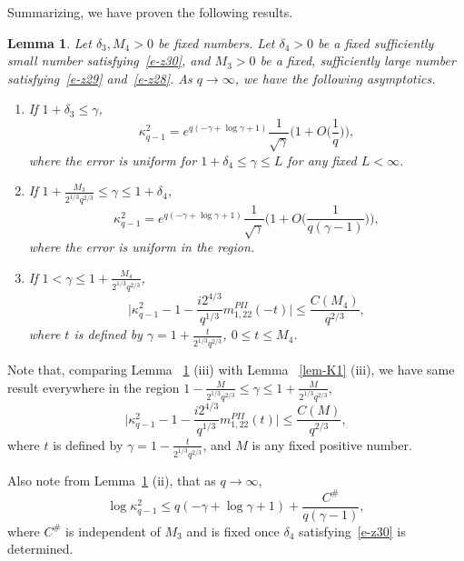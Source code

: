 \documentclass{amsart}
\newtheorem{lem}[thm]{Lemma}
\theoremstyle{definition}
\theoremstyle{remark}
\numberwithin{equation}{section}
\begin{document}
Summarizing, we have proven the following results.
\begin{lem}\label{lem-K2}
  Let $\delta_3, M_4>0$ be fixed numbers.
  Let $\delta_4>0$ be a fixed sufficiently 
small number satisfying~\eqref{e-z30}, 
and $M_3>0$ be a fixed, sufficiently large number 
satisfying~\eqref{e-z29} and~\eqref{e-z28}.
As $q \to \infty$, we have the following asymptotics.
  \begin{enumerate}
    \item If $1+\delta_3 \le \gamma$,
\begin{equation*}
  \kappa^2_{q-1}
= e^{q(-\gamma+\log \gamma+1)}\frac1{\sqrt{\gamma}}
\biggl(1+O\bigl(\frac1{q}\bigr)\biggr),
\end{equation*}
where the error is uniform for $1+\delta_4 \le \gamma\le L$ for 
any fixed $L< \infty$.
    \item If $1+\frac{M_3}{2^{1/3}q^{2/3}} \le \gamma \le 1+\delta_4$,
\begin{equation*}
  \kappa^2_{q-1}=e^{q(-\gamma+\log \gamma+1)} \frac1{\sqrt{\gamma}}
\biggl(1+O\bigl(\frac1{q(\gamma-1)}\bigr) \biggr),
\end{equation*}
where the error is uniform in the region.
    \item If $1< \gamma \le 1+\frac{M_4}{2^{1/3}q^{2/3}}$, 
\begin{equation*}
  \bigl|\kappa^2_{q-1}
- 1 -\frac{i2^{4/3}}{q^{1/3}}m^{PII}_{1,22}(-t)\bigr|\le  \frac{C(M_4)}{q^{2/3}},
\end{equation*}
where $t$ is defined by $\gamma=1+\frac{t}{2^{1/3}q^{2/3}}$, $0\le t\le M_4$.
  \end{enumerate}
\end{lem}

Note that, comparing Lemma ~\ref{lem-K2} (iii) with Lemma ~\ref{lem-K1} (iii), 
we have same result everywhere in the region $1-\frac{M}{2^{1/3}q^{2/3}} \le 
\gamma \le 1+\frac{M}{2^{1/3}q^{2/3}}$, 
\begin{equation}\label{e-z36}
     \bigl|\kappa^2_{q-1}
- 1 -\frac{i2^{4/3}}{q^{1/3}}m^{PII}_{1,22}(t)\bigr|\le  \frac{C(M)}{q^{2/3}},
\end{equation}
where $t$ is defined by $\gamma=1-\frac{t}{2^{1/3}q^{2/3}}$, 
and $M$ is any fixed positive number.

Also note from Lemma~\ref{lem-K2} (ii), that as $q\to\infty$, 
\begin{equation}\label{e-z37}
   \log\kappa^2_{q-1}\le q(-\gamma+\log\gamma +1) + \frac{C^{\#}}{q(\gamma-1)},
\end{equation}
where $C^{\#}$ is independent of $M_3$ and is fixed once $\delta_4$ 
satisfying~\eqref{e-z30} is determined.
\end{document}
